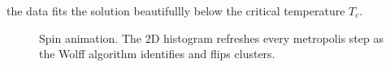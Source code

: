 \documentclass[singlepage,notitlepage,nofootinbib,11pt]{revtex4-1}
\begin{document}
the data fits the solution beautifullly below the critical temperature $T_c$.
\begin{figure}[h]
  \centering
  \captionsetup[subfigure]{labelformat=empty}
  \caption{\label{animation} Spin animation. The 2D histogram refreshes every metropolis step as the Wolff algorithm identifies and flips clusters.}
\end{figure}
\end{document}
